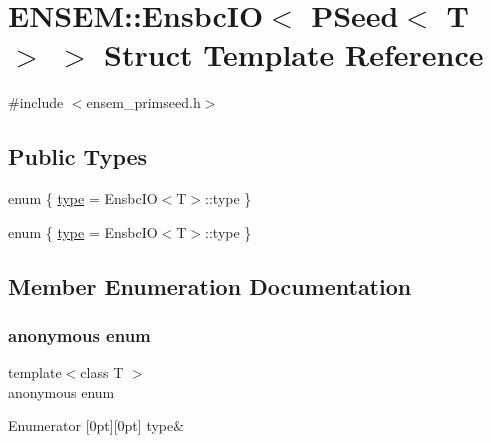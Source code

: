 \hypertarget{structENSEM_1_1EnsbcIO_3_01PSeed_3_01T_01_4_01_4}{}\section{E\+N\+S\+EM\+:\+:Ensbc\+IO$<$ P\+Seed$<$ T $>$ $>$ Struct Template Reference}
\label{structENSEM_1_1EnsbcIO_3_01PSeed_3_01T_01_4_01_4}


{\ttfamily \#include $<$ensem\+\_\+primseed.\+h$>$}

\subsection*{Public Types}
\begin{DoxyCompactItemize}
\item 
enum \{ \mbox{\hyperlink{structENSEM_1_1EnsbcIO_3_01PSeed_3_01T_01_4_01_4_a49f19193ce9db32abc1719c7cd9ef660a1d0ff116fce48938950c1c1cf00d6c59}{type}} = Ensbc\+IO$<$T$>$\+:\+:type
 \}
\item 
enum \{ \mbox{\hyperlink{structENSEM_1_1EnsbcIO_3_01PSeed_3_01T_01_4_01_4_a49f19193ce9db32abc1719c7cd9ef660a1d0ff116fce48938950c1c1cf00d6c59}{type}} = Ensbc\+IO$<$T$>$\+:\+:type
 \}
\end{DoxyCompactItemize}


\subsection{Member Enumeration Documentation}
\mbox{\label{structENSEM_1_1EnsbcIO_3_01PSeed_3_01T_01_4_01_4_a49f19193ce9db32abc1719c7cd9ef660}} 
\subsubsection{\texorpdfstring{anonymous enum}{anonymous enum}}
{\footnotesize\ttfamily template$<$class T $>$ \\
anonymous enum}

\begin{DoxyEnumFields}{Enumerator}
[0pt][0pt]{}\mbox{\label{structENSEM_1_1EnsbcIO_3_01PSeed_3_01T_01_4_01_4_a49f19193ce9db32abc1719c7cd9ef660a1d0ff116fce48938950c1c1cf00d6c59}} 
type&\\
\hline

\end{DoxyEnumFields}
\mbox{\label{structENSEM_1_1EnsbcIO_3_01PSeed_3_01T_01_4_01_4_a58a45aea37dcb681ef17ed266f4aa452}} 

